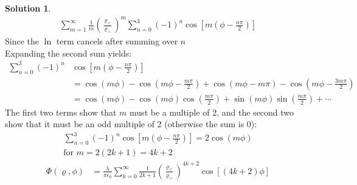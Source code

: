 \documentclass[letter,12pt]{article}
\theoremstyle{definition}
\newtheorem*{sol}{Solution}
\begin{document}
\begin{enumerate}
\begin{enumerate}
\begin{sol}
\begin{align*}
                            \sum_{m = 1}^{\infty}\frac{1}{m}
                            {\left(
                                \frac{\varrho_<}{\varrho_>}
                            \right)}^m
                            \sum_{n = 0}^{3}{(-1)}^n
                            \cos\left[m (\phi - \frac{n \pi}{2})\right]
                        \end{align*}
                        Since the $\ln$ term cancels after summing over $n$
                        \\
                        Expanding the second sum yields:
                        \begin{align*}
                            \sum_{n = 0}^{3}{(-1)}^n
                            &\cos\left[m (\phi - \frac{n \pi}{2})\right]
                            \\
                            &=
                            \cos(m \phi) - \cos \left(m \phi - \frac{m \pi}{2}\right)
                            + \cos \left(m \phi - m \pi\right)
                            - \cos \left(m \phi - \frac{3 m \pi}{2}\right)
                            \\
                            &= \cos(m\phi) - \cos(m\phi)\cos\left(\frac{m\pi}{2}\right)
                            + \sin(m \phi)\sin\left(\frac{m \pi}{2}\right) + \cdots
                        \end{align*}
                        The first two terms show that $m$ must be a
                        multiple of 2, and the second two show that it
                        must be an odd multiple of 2 (otherwise the
                        sum is 0):
                        \begin{align*}
                            \sum_{n = 0}^{3}{(-1)}^n
                            \cos\left[m (\phi - \frac{n \pi}{2})\right]
                            = 2 \cos (m \phi)
                            \\
                            \text{for }
                            m = 2 (2k + 1) = 4k + 2
                        \end{align*}
                        \begin{align*}
                            \Phi(\varrho, \phi) &= \frac{\lambda}{\pi \epsilon_0}
                            \sum_{k = 0}^{\infty}\frac{1}{2k + 1}
                            {\left(
                                \frac{\varrho_<}{\varrho_>}
                            \right)}^{4k + 2}
                            \cos\left[ (4k + 2) \phi \right]

\end{align*}
\end{sol}
\end{enumerate}
\end{enumerate}
\end{document}
